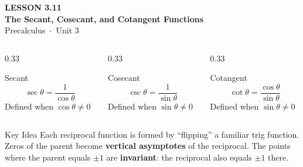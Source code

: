 \documentclass[aspectratio=169, 11pt]{beamer}
\begin{document}
{
\begin{frame}[plain]
  \vspace{2.8cm}\hspace{0.55cm}%
  \begin{minipage}{0.9\textwidth}
    {\color{goldacc}\bfseries\small LESSON 3.11}\\[0.5cm]
    {\color{white}\bfseries\LARGE The Secant, Cosecant, and Cotangent Functions}\\[1.2cm]
    {\color{skymid}\small Precalculus~$\cdot$~Unit 3}
  \end{minipage}
\end{frame}
}

\begin{frame}[t, plain]

  \begin{columns}[T]
    \begin{column}{0.33\textwidth}
      \begin{block}{Secant}
        $$\sec\theta = \frac{1}{\cos\theta}$$
        Defined when $\cos\theta \neq 0$
      \end{block}
    \end{column}
    \begin{column}{0.33\textwidth}
      \begin{block}{Cosecant}
        $$\csc\theta = \frac{1}{\sin\theta}$$
        Defined when $\sin\theta \neq 0$
      \end{block}
    \end{column}
    \begin{column}{0.33\textwidth}
      \begin{block}{Cotangent}
        $$\cot\theta = \frac{\cos\theta}{\sin\theta}$$
        Defined when $\sin\theta \neq 0$
      \end{block}
    \end{column}
  \end{columns}

  \vspace{0.5cm}
  \begin{block}{Key Idea}
    Each reciprocal function is formed by ``flipping'' a familiar trig function.
    Zeros of the parent become \textbf{vertical asymptotes} of the reciprocal.
    The points where the parent equals $\pm 1$ are \textbf{invariant}: the reciprocal
    also equals $\pm 1$ there.
  \end{block}
\end{frame}
\end{document}

